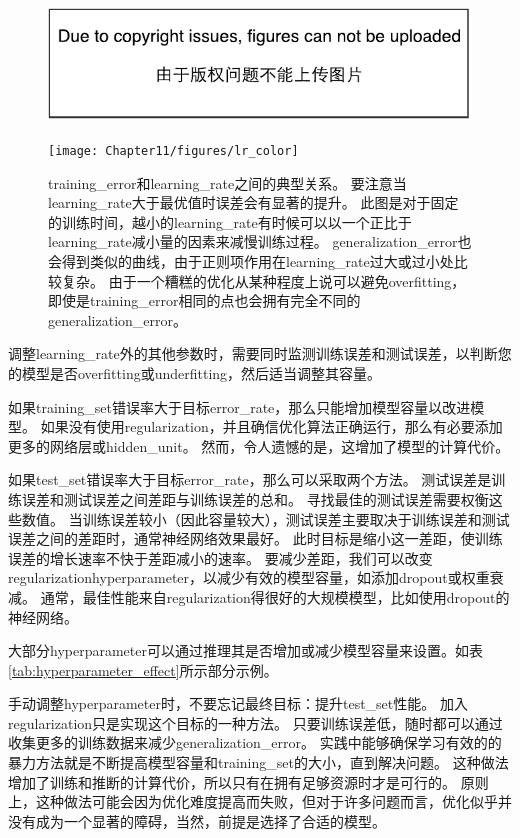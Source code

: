 \begin{figure}[!htb]
\ifOpenSource
\centerline{\includegraphics{figure.pdf}}
\else
\centerline{\texttt{[image: Chapter11/figures/lr\_color]}}
\fi
\caption{\gls{training_error}和\gls{learning_rate}之间的典型关系。
要注意当\gls{learning_rate}大于最优值时误差会有显著的提升。
此图是对于固定的训练时间，越小的\gls{learning_rate}有时候可以以一个正比于\gls{learning_rate}减小量的因素来减慢训练过程。
\gls{generalization_error}也会得到类似的曲线，由于正则项作用在\gls{learning_rate}过大或过小处比较复杂。
由于一个糟糕的优化从某种程度上说可以避免\gls{overfitting}，即使是\gls{training_error}相同的点也会拥有完全不同的\gls{generalization_error}。}
\label{fig:chap11_lr}
\end{figure}

调整\gls{learning_rate}外的其他参数时，需要同时监测训练误差和测试误差，以判断您的模型是否\gls{overfitting}或\gls{underfitting}，然后适当调整其容量。

如果\gls{training_set}错误率大于目标\gls{error_rate}，那么只能增加模型容量以改进模型。
如果没有使用\gls{regularization}，并且确信优化算法正确运行，那么有必要添加更多的网络层或\gls{hidden_unit}。
然而，令人遗憾的是，这增加了模型的计算代价。


如果\gls{test_set}错误率大于目标\gls{error_rate}，那么可以采取两个方法。
测试误差是训练误差和测试误差之间差距与训练误差的总和。
寻找最佳的测试误差需要权衡这些数值。
当训练误差较小（因此容量较大），测试误差主要取决于训练误差和测试误差之间的差距时，通常神经网络效果最好。
此时目标是缩小这一差距，使训练误差的增长速率不快于差距减小的速率。
要减少差距，我们可以改变\gls{regularization}\gls{hyperparameter}，以减少有效的模型容量，如添加\gls{dropout}或权重衰减。
通常，最佳性能来自\gls{regularization}得很好的大规模模型，比如使用\gls{dropout}的神经网络。

大部分\gls{hyperparameter}可以通过推理其是否增加或减少模型容量来设置。如表\ref{tab:hyperparameter_effect}所示部分示例。

手动调整\gls{hyperparameter}时，不要忘记最终目标：提升\gls{test_set}性能。
加入\gls{regularization}只是实现这个目标的一种方法。
只要训练误差低，随时都可以通过收集更多的训练数据来减少\gls{generalization_error}。
实践中能够确保学习有效的的暴力方法就是不断提高模型容量和\gls{training_set}的大小，直到解决问题。
这种做法增加了训练和推断的计算代价，所以只有在拥有足够资源时才是可行的。
原则上，这种做法可能会因为优化难度提高而失败，但对于许多问题而言，优化似乎并没有成为一个显著的障碍，当然，前提是选择了合适的模型。

